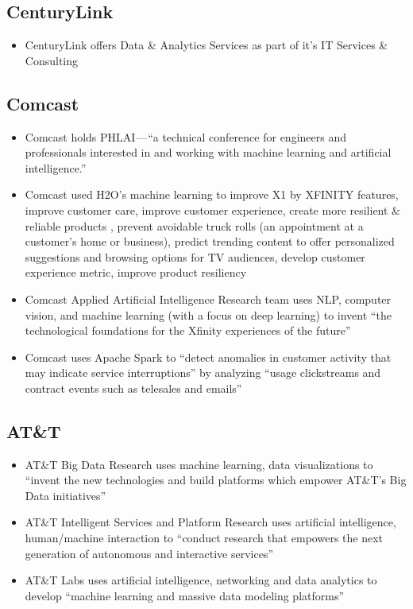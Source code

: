 \documentclass[12pt]{article}
\begin{document}
\subsection{CenturyLink}
\begin{itemize}
	\item CenturyLink offers Data \& Analytics Services as part of it’s IT Services \& Consulting \cite{centurylink}
\end{itemize}

\subsection{Comcast}
\begin{itemize}
	\item Comcast holds PHLAI — “a technical conference for engineers and professionals interested in and working with machine learning and artificial intelligence.” \cite{h2o1}
	\item Comcast used H2O's machine learning to improve X1 by XFINITY features, improve customer care, improve customer experience, create more resilient \& reliable products \cite{h2o1}, prevent avoidable truck rolls (an appointment at a customer’s home or business), predict trending content to offer personalized suggestions and browsing options for TV audiences, develop customer experience metric, improve product resiliency \cite{h2o2}
	\item Comcast Applied Artificial Intelligence Research team uses NLP, computer vision, and machine learning (with a focus on deep learning) to invent “the technological foundations for the Xfinity experiences of the future” 
	\item Comcast uses Apache Spark to “detect anomalies in customer activity that may indicate service interruptions” by analyzing “usage clickstreams and contract events such as telesales and emails”
\end{itemize}

\subsection{AT\&T}
\begin{itemize}
	\item AT\&T Big Data Research uses machine learning, data visualizations to “invent the new technologies and build platforms which empower AT\&T’s Big Data initiatives” \cite{att}
	\item AT\&T Intelligent Services and Platform Research uses artificial intelligence, human/machine interaction to “conduct research that empowers the next generation of autonomous and interactive services” \cite{att}
	\item AT\&T Labs uses artificial intelligence, networking and data analytics to develop “machine learning and massive data modeling platforms” \cite{att}
\end{itemize}
\end{document}
